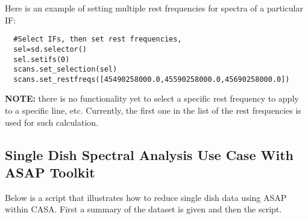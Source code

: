 Here is an example of setting multiple rest frequencies for spectra of a particular IF:
\begin{verbatim}
  #Select IFs, then set rest frequencies,
  sel=sd.selector()
  sel.setifs(0)
  scans.set_selection(sel)
  scans.set_restfreqs([45490258000.0,45590258000.0,45690258000.0])
\end{verbatim}

{\bf NOTE:} there is no functionality yet to select a specific rest frequency 
to apply to a specific line, etc. Currently, the first one in the list
of the rest frequencies is used for such calculation.

 
\subsection{Single Dish Spectral Analysis Use Case With ASAP Toolkit}
\label{subsection:sd.asap.usecase}

Below is a script that illustrates how to reduce single dish data
using ASAP within CASA.  First a summary of the dataset is given and
then the script.

